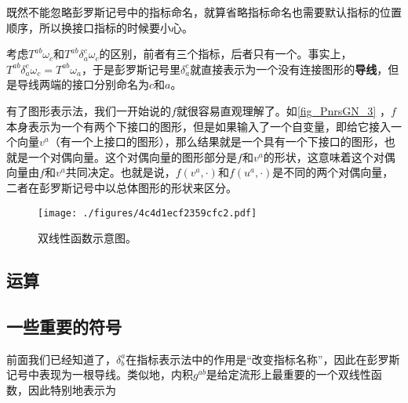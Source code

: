 既然不能忽略彭罗斯记号中的指标命名，就算省略指标命名也需要默认指标的位置顺序，所以换接口指标的时候要小心。

考虑$T^{ab}\omega_{c}$和$T^{ab}\delta^c_a\omega_{c}$的区别，前者有三个指标，后者只有一个。事实上，$T^{ab}\delta^c_a\omega_{c} = T^{ab}\omega_{a}$，于是彭罗斯记号里$\delta^c_a$就直接表示为一个没有连接图形的\textbf{导线}，但是导线两端的接口分别命名为$c$和$a$。


有了图形表示法，我们一开始说的$f$就很容易直观理解了。如\autoref{fig_PnrsGN_3} ，$f$本身表示为一个有两个下接口的图形，但是如果输入了一个自变量，即给它接入一个向量$v^a$（有一个上接口的图形），那么结果就是一个具有一个下接口的图形，也就是一个对偶向量。这个对偶向量的图形部分是$f$和$v^a$的形状，这意味着这个对偶向量由$f$和$v^a$共同决定。也就是说，$f(v^a, \cdot)$和$f(u^a, \cdot)$是不同的两个对偶向量，二者在彭罗斯记号中以总体图形的形状来区分。

\begin{figure}[ht]
\centering
\texttt{[image: ./figures/4c4d1ecf2359cfc2.pdf]}
\caption{双线性函数示意图。} \label{fig_PnrsGN_3}
\end{figure}



\subsection{运算}










\subsection{一些重要的符号}


前面我们已经知道了，$\delta_b^a$在指标表示法中的作用是“改变指标名称”，因此在彭罗斯记号中表现为一根导线。类似地，内积$g^{ab}$是给定流形上最重要的一个双线性函数，因此特别地表示为





























